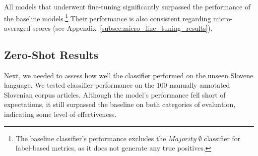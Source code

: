 \documentclass[10pt, a4paper]{article}
\begin{document}
All models that underwent fine-tuning significantly surpassed the performance of the baseline models.\footnote{The baseline classifier's performance excludes the $Majority\;\emptyset$ classifier for label-based metrics, as it does not generate any true positives.}
Their performance is also consistent regarding micro-averaged scores (see Appendix~\ref{subsec:micro_fine_tuning_results}).

\subsection{Zero-Shot Results}
\label{subsec:zero_shot_results}

Next, we needed to assess how well the classifier performed on the unseen Slovene language.
We tested classifier performance on the 100 manually annotated Slovenian corpus articles.
Although the model's performance fell short of expectations, it still surpassed the baseline on both categories of evaluation, indicating some level of effectiveness.

\begin{table}[H]
\begin{center}
\caption{Example-based Zero-Shot classifier performance - shows the pre-trained model used, followed by a problem transformation method, selected article fields for training, classification accuracy (higher is better), and Hamming loss (lower is better). The results are compared to baseline models (the no-label, the most common label, and the random classifier).}
\label{tab:zeroshot_example_results}
\end{center}
\end{table}
\end{document}

